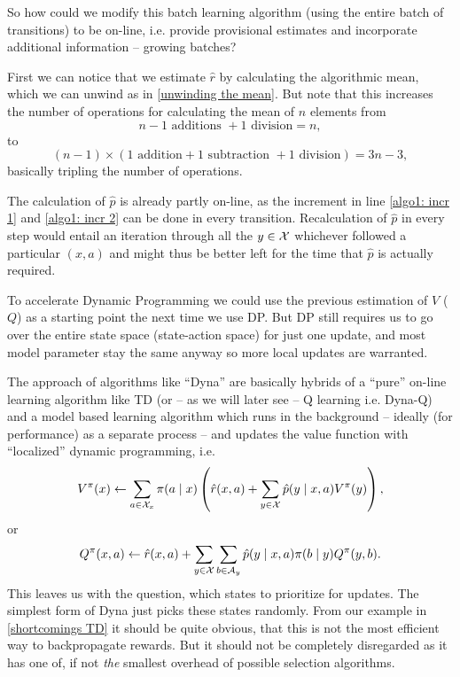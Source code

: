 So how could we modify this batch learning algorithm (using the entire batch of transitions) to be on-line, i.e. provide provisional estimates and incorporate additional information -- growing batches?

First we can notice that we estimate \(\hat{r}\) by calculating the algorithmic mean, which we can unwind as in \ref{unwinding the mean}. But note that this increases the number of operations for calculating the mean of \(n\) elements from 
\[
	n-1 \text{ additions } + 1\text{ division} = n,
\]
to 
\[
	(n-1) \times (1\text{ addition} + 1 \text{ subtraction } + 1\text{ division})=3n - 3,
\]
basically tripling the number of operations. 

The calculation of \(\hat{p}\) is already partly on-line, as the increment  in line \ref{algo1: incr 1} and \ref{algo1: incr 2} can be done in every transition. Recalculation of  \(\hat{p}\) in every step would entail an iteration through all the \(y\in\mathcal{X}\) whichever followed a particular \((x,a)\) and might thus be better left for the time that \(\hat{p}\) is actually required.

To accelerate Dynamic Programming we could use the previous estimation of \(V\) (\(Q\)) as a starting point the next time we use DP. But DP still requires us to go over the entire state space (state-action space) for just one update, and most model parameter stay the same anyway so more local updates are warranted.

The approach of algorithms like ``Dyna'' are basically hybrids of a ``pure'' on-line learning algorithm like TD (or -- as we will later see -- Q learning i.e. Dyna-Q) and a model based learning algorithm which runs in the background -- ideally (for performance) as a separate process -- and updates the value function with ``localized'' dynamic programming, i.e.
\begin{align}
	\label{async DP V}
	V^\pi(x) \gets \sum_{a\in\mathcal{X}_x}\pi(a\mid x) \left( \hat{r}(x,a) + \sum_{y\in\mathcal{X}} \hat{p}(y\mid x,a) V^\pi(y)\right),
\end{align}
or
\begin{align}\label{async DP Q}
	Q^\pi(x,a) \gets \hat{r}(x,a) + \sum_{y\in\mathcal{X}}\sum_{b\in\mathcal{A}_y} \hat{p}(y\mid x,a) \pi(b\mid y) Q^\pi(y,b).
\end{align}
This leaves us with the question, which states to prioritize for updates. The simplest form of Dyna just picks these states randomly. From our example in \ref{shortcomings TD} it should be quite obvious, that this is not the most efficient way to backpropagate rewards. But it should not be completely disregarded as it has one of, if not \emph{the} smallest overhead of possible selection algorithms. 

